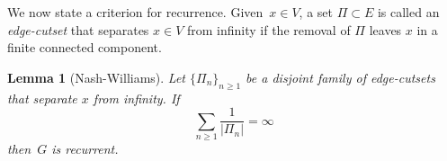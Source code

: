 \documentclass[a4paper,11pt]{article}
\newtheorem{theorem}{Theorem}
\newtheorem{lemma}{Lemma}
\theoremstyle{definition}
\begin{document}
We now state a criterion for recurrence. Given~$x \in V$, a set $\Pi \subset E$ is called an \emph{edge-cutset} that separates $x \in V$ from infinity if the removal of $\Pi$ leaves $x$ in a finite connected component.
\begin{lemma}[Nash-Williams]\label{thm:infinite_nash_williams}
    Let $\{\Pi_n\}_{n \ge 1}$ be a disjoint family of edge-cutsets that separate $x$ from infinity. If 
    \[
    \sum_{n \ge 1} \frac{1}{|\Pi_n|} = \infty
    \]
    then~$G$ is recurrent.
\end{lemma}


\end{document}
